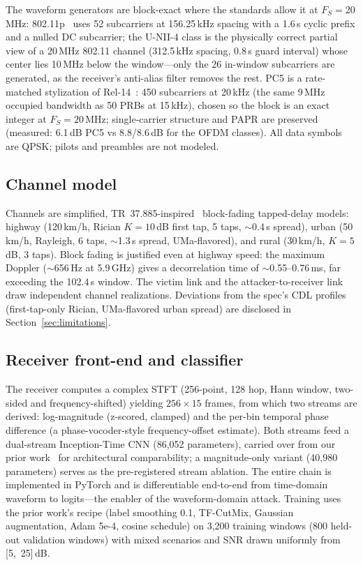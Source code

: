 \documentclass[review]{elsarticle}
\begin{document}
The waveform generators are block-exact where the standards allow it at
$F_S=20$\,MHz: 802.11p~\cite{ieee80211} uses 52 subcarriers at 156.25\,kHz spacing with a
1.6\,\textmu s cyclic prefix and a nulled DC subcarrier; the U-NII-4 class is
the physically correct partial view of a 20\,MHz 802.11 channel (312.5\,kHz
spacing, 0.8\,\textmu s guard interval) whose center lies 10\,MHz below the
window---only the 26 in-window subcarriers are generated, as the receiver's
anti-alias filter removes the rest. PC5 is a rate-matched stylization of
Rel-14~\cite{ts36211}: 450 subcarriers at 20\,kHz (the same 9\,MHz occupied
bandwidth as 50 PRBs at 15\,kHz), chosen so the block is an exact integer at
$F_S=20$\,MHz; single-carrier structure and PAPR are preserved (measured:
6.1\,dB PC5 vs 8.8/8.6\,dB for the OFDM classes). All data symbols are
QPSK; pilots and preambles are not modeled.

\subsection{Channel model}
\label{sec:channels}

Channels are simplified, TR~37.885-inspired~\cite{tr37885} block-fading
tapped-delay models: highway (120\,km/h, Rician $K=10$\,dB first tap, 5
taps, ${\sim}$0.4\,\textmu s spread), urban (50\,km/h, Rayleigh, 6 taps,
${\sim}$1.3\,\textmu s spread, UMa-flavored), and rural (30\,km/h, $K=5$\,dB,
3 taps). Block fading is justified even at highway speed: the maximum Doppler
(${\sim}$656\,Hz at 5.9\,GHz) gives a decorrelation time of
${\sim}$0.55--0.76\,ms, far exceeding the 102.4\,\textmu s window. The
victim link and the attacker-to-receiver link draw independent channel
realizations. Deviations from the spec's CDL profiles (first-tap-only
Rician, UMa-flavored urban spread) are disclosed in
Section~\ref{sec:limitations}.

\subsection{Receiver front-end and classifier}
\label{sec:frontend}

The receiver computes a complex STFT (256-point, 128 hop, Hann window,
two-sided and frequency-shifted) yielding $256\times15$ frames, from which
two streams are derived: log-magnitude (z-scored, clamped) and the per-bin
temporal phase difference (a phase-vocoder-style frequency-offset estimate).
Both streams feed a dual-stream Inception-Time CNN (86,052 parameters),
carried over from our prior work~\cite{dhankhar2026} for architectural
comparability; a magnitude-only variant (40,980 parameters) serves as the
pre-registered stream ablation. The entire chain is implemented in PyTorch
and is differentiable end-to-end from time-domain waveform to logits---the
enabler of the waveform-domain attack. Training uses the prior work's recipe
(label smoothing 0.1, TF-CutMix, Gaussian augmentation, Adam 5e-4, cosine
schedule) on 3,200 training windows (800 held-out validation windows) with
mixed scenarios and SNR drawn uniformly from [5,~25]\,dB.
\end{document}
